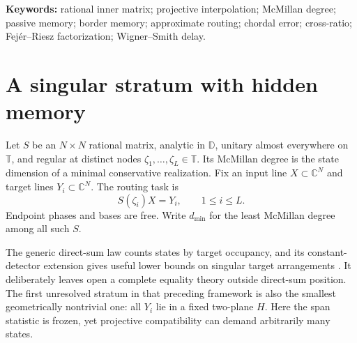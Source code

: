 \documentclass[11pt]{article}
\theoremstyle{definition}\newtheorem{definition}[theorem]{Definition}\newtheorem{example}[theorem]{Example}
\theoremstyle{remark}\newtheorem{remark}[theorem]{Remark}\newtheorem{limitation}[theorem]{Limitation}
\newcommand{\C}{\mathbb C}\newcommand{\D}{\mathbb D}\newcommand{\T}{\mathbb T}
\begin{document}
\begin{abstract}
This reduction reveals two competing mechanisms.  For two target lines with
occupancies $n_0,n_\infty$, the exact cost is $\max(n_0,n_\infty)$, a fiber
multiplicity law.  By contrast, for $L$ distinct generic coplanar targets,
\[
             d_{\min}=\left\lceil\frac{L-1}{2}\right\rceil,
\]
whereas both the span bound and the optimized constant-detector hierarchy of
the preceding framework equal one.  Their
multiplicative underestimate is therefore unbounded.  For four nodes we give the
complete phase diagram: degree zero for one constant target, degree one exactly
for four distinct targets with matching ordered cross-ratio, degree three for a
$3+1$ collision, and degree two in every remaining case.  For the strict
four-node fixture, an exact Sylvester certificate forces more than $21\%$
worst-node error on every one-state router.  Exact Gaussian-rational fixtures
verify all strata, the quantitative obstruction, and the generic law through
$L=16$.  Exact producer, replay validator, frozen
evidence, and immutable release metadata are linked in the paper.
\end{abstract}

\noindent\textbf{Keywords:} rational inner matrix; projective interpolation;
McMillan degree; passive memory; border memory; approximate routing; chordal error;
cross-ratio; Fej\'er--Riesz factorization; Wigner--Smith delay.

\section{A singular stratum with hidden memory}

Let $S$ be an $N\times N$ rational matrix, analytic in $\D$, unitary almost
everywhere on $\T$, and regular at distinct nodes
$\zeta_1,\ldots,\zeta_L\in\T$.  Its McMillan degree is the state dimension of a
minimal conservative realization.  Fix an input line $X\subset\C^N$ and target
lines $Y_i\subset\C^N$.  The routing task is
\begin{equation}\label{eq:routing}
                              S(\zeta_i)X=Y_i,
                              \qquad 1\le i\le L.
\end{equation}
Endpoint phases and bases are free.  Write $d_{\min}$ for the least McMillan
degree among all such $S$.

The generic direct-sum law counts states by target occupancy, and its
constant-detector extension gives useful lower bounds on singular target
arrangements \cite{ErikssonUnified2026}.  It deliberately leaves open a complete
equality theory outside direct-sum position.  The first unresolved stratum in
that preceding framework is
also the smallest geometrically nontrivial one: all $Y_i$ lie in a fixed
two-plane $H$.  Here the span statistic is frozen, yet projective compatibility
can demand arbitrarily many states.
\end{document}
